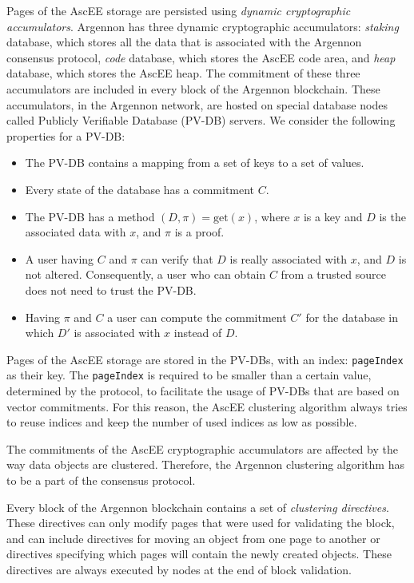 Pages of the AscEE storage are persisted using \emph{dynamic cryptographic accumulators}. Argennon
has three dynamic cryptographic accumulators: \emph{staking} database, which stores all the data that is associated with
the Argennon consensus protocol, \emph{code} database, which stores the AscEE code area, and \emph{heap} database,
which stores the AscEE heap. The commitment of these three accumulators are included in every block of the Argennon
blockchain. These accumulators, in the Argennon network, are hosted on special database nodes called Publicly
Verifiable Database (PV-DB) servers.
We consider the following properties for a PV-DB:
\begin{itemize}
    \item The PV-DB contains a mapping from a set of keys to a set of values.
    \item Every state of the database has a commitment \(C\).
    \item The PV-DB has a method \((D, \pi) = \text{get}(x)\), where \(x\) is a key and \(D\) is the associated data
    with \(x\), and \(\pi\) is a proof.
    \item A user having \(C\) and \(\pi\) can verify that \(D\) is really associated with \(x\), and \(D\) is not
    altered. Consequently, a user who can obtain \(C\) from a trusted source does not need to trust the PV-DB\@.
    \item Having \(\pi\) and \(C\) a user can compute the commitment \(C'\) for the database in which \(D'\) is
    associated with \(x\) instead of \(D\).
\end{itemize}

Pages of the AscEE storage are stored in the PV-DBs, with an index: \texttt{pageIndex} as their key.
The \texttt{pageIndex} is required to be smaller than a certain value, determined by the
protocol, to facilitate the usage of PV-DBs that are based on vector commitments.
For this reason, the AscEE clustering algorithm always tries to reuse indices and keep the number of used indices
as low as possible.

The commitments of the AscEE cryptographic accumulators are affected by the way data objects are clustered. Therefore,
the Argennon clustering algorithm has to be a part of the consensus protocol.

Every block of the Argennon blockchain contains a set of \emph{clustering directives}. These directives
can only modify pages that were used for validating the block, and can
include directives for moving an object from one page to another or directives specifying which pages will contain
the newly created objects. These directives are always executed by nodes at the end of block validation.

